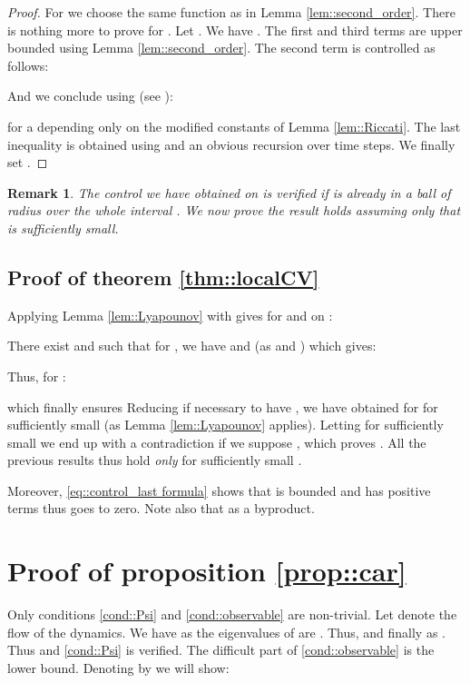 \documentclass[a4paper,12pt,onecolumn]{article}
\newtheorem{rem}{Remark}
\begin{document}
\begin{proof}
For  we choose the same function as in Lemma \ref{lem::second_order}. There is nothing more to prove for . Let . We have . The first and third terms are upper bounded using Lemma \ref{lem::second_order}. The second term is controlled as follows:

And we conclude using (see \cite{deyst}): 

for a  depending only on the modified constants of Lemma \ref{lem::Riccati}. The last inequality is obtained using  and an obvious recursion over  time steps. We finally set .
\end{proof}

\begin{rem}
The control we have obtained on  is verified if  is \emph{already} in a ball of radius  over the whole interval . We now prove the result holds assuming \emph{only} that  is sufficiently small.
\end{rem}

\subsection{Proof of theorem \ref{thm::localCV}}
Applying Lemma \ref{lem::Lyapounov} with  gives for  and  on  :

There exist  and  such that for , we have  and  (as  and ) which gives:

Thus, for :

which finally ensures
Reducing  if necessary to have , we have obtained  for  for sufficiently small  (as Lemma \ref{lem::Lyapounov} applies).   Letting  for sufficiently small  we end up with a contradiction if we suppose , which proves . All the previous results thus hold \emph{only} for sufficiently small . 


Moreover, \eqref{eq::control_last formula} shows that  is bounded and has positive terms thus  goes to zero. Note also that  as a byproduct.





\section{Proof of proposition \ref{prop::car}}
\label{proof::car}
Only conditions \eqref{cond::Psi} and \eqref{cond::observable} are non-trivial. Let  denote the flow of the dynamics. We have  as the eigenvalues of  are . Thus,  and finally  as .  Thus  and \eqref{cond::Psi} is verified. The difficult part of \eqref{cond::observable} is the lower bound. Denoting  by  we will show:
\end{document}
